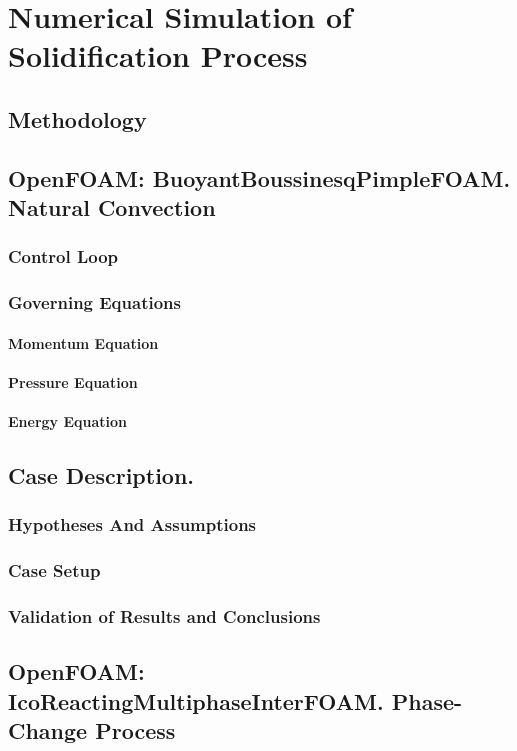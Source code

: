 
\chapter{Numerical Simulation of Solidification Process} %

\label{Chapter3} %
\section{Methodology}
\section{OpenFOAM: BuoyantBoussinesqPimpleFOAM. Natural Convection}
\subsection{Control Loop}
\subsection{Governing Equations}
\subsubsection{Momentum Equation}
\subsubsection{Pressure Equation}
\subsubsection{Energy Equation}
\section{Case Description.}
\subsection{Hypotheses And Assumptions}
\subsection{Case Setup}
\subsection{Validation of Results and Conclusions}
\section{OpenFOAM: IcoReactingMultiphaseInterFOAM. Phase-Change Process}
